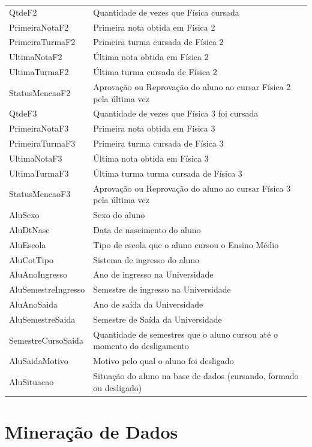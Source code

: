\begin{longtable}{C{4cm}|C{12cm}}
		QtdeF2 & Quantidade de vezes que Física cursada\\
		PrimeiraNotaF2 & Primeira nota obtida em Física 2\\
		PrimeiraTurmaF2 & Primeira turma cursada de Física 2\\
		UltimaNotaF2 & Última nota obtida em Física 2\\
		UltimaTurmaF2 & Última turma cursada de Física 2\\
		StatusMencaoF2 & Aprovação ou Reprovação do aluno ao cursar Física 2 pela última vez\\
		QtdeF3 & Quantidade de vezes que Física 3 foi cursada\\
		PrimeiraNotaF3 & Primeira nota obtida em Física 3\\
		PrimeiraTurmaF3 & Primeira turma cursada de Física 3\\
		UltimaNotaF3 & Última nota obtida em Física 3\\
		UltimaTurmaF3 & Última turma turma cursada de Física 3\\
		StatusMencaoF3 & Aprovação ou Reprovação do aluno ao cursar Física 3 pela última vez\\
		AluSexo & Sexo do aluno\\
		AluDtNasc & Data de nascimento do aluno\\
		AluEscola & Tipo de escola que o aluno cursou o Ensino Médio\\
		AluCotTipo & Sistema de ingresso do aluno\\
		AluAnoIngresso & Ano de ingresso na Universidade\\
		AluSemestreIngresso & Semestre de ingresso na Universidade\\
		AluAnoSaida & Ano de saída da Universidade\\
		AluSemestreSaida & Semestre de Saída da Universidade\\
		SemestreCursoSaida & Quantidade de semestres que o aluno cursou até o momento do desligamento\\
		AluSaidaMotivo & Motivo pelo qual o aluno foi desligado\\
		AluSituacao & Situação do aluno na base de dados (cursando, formado ou desligado)\\
		\hline
	\end{longtable}
				

	
\section{Mineração de Dados} \label{5subtitle4}

